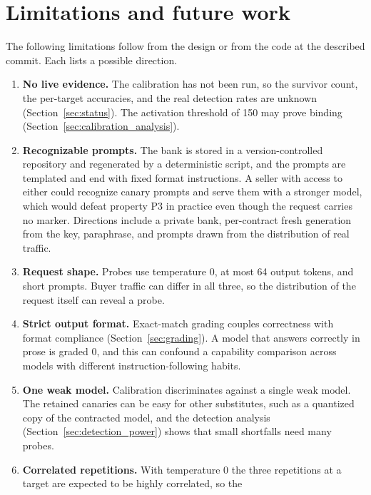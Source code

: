 \section{Limitations and future work}
\label{sec:limitations}

The following limitations follow from the design or from the code at the
described commit. Each lists a possible direction.

\begin{enumerate}
  \item \textbf{No live evidence.} The calibration has not been run, so the
    survivor count, the per-target accuracies, and the real detection rates are
    unknown (Section~\ref{sec:status}). The activation threshold of 150 may
    prove binding (Section~\ref{sec:calibration_analysis}).
  \item \textbf{Recognizable prompts.} The bank is stored in a version-controlled
    repository and regenerated by a deterministic script, and the prompts are
    templated and end with fixed format instructions. A seller with access to
    either could recognize canary prompts and serve them with a stronger model,
    which would defeat property P3 in practice even though the request carries no
    marker. Directions include a private bank, per-contract fresh generation
    from the key, paraphrase, and prompts drawn from the distribution of real
    traffic.
  \item \textbf{Request shape.} Probes use temperature $0$, at most 64 output
    tokens, and short prompts. Buyer traffic can differ in all three, so the
    distribution of the request itself can reveal a probe.
  \item \textbf{Strict output format.} Exact-match grading couples correctness
    with format compliance (Section~\ref{sec:grading}). A model that answers
    correctly in prose is graded $0$, and this can confound a capability
    comparison across models with different instruction-following habits.
  \item \textbf{One weak model.} Calibration discriminates against a single weak
    model. The retained canaries can be easy for other substitutes, such as a
    quantized copy of the contracted model, and the detection analysis
    (Section~\ref{sec:detection_power}) shows that small shortfalls need many
    probes.
  \item \textbf{Correlated repetitions.} With temperature $0$ the three
    repetitions at a target are expected to be highly correlated, so the

\end{enumerate}
